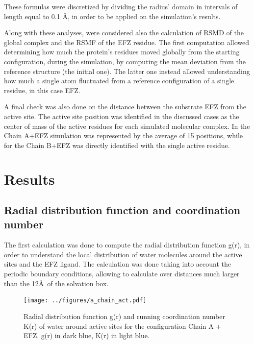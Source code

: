 \documentclass[12pt]{article}
\begin{document}
These formulas were discretized by dividing the radius' domain in intervals of length equal to 0.1 \AA, in order to be applied on the simulation's results.

Along with these analyses, were considered also the calculation of RSMD of the global complex and the RSMF of the EFZ residue. The first computation allowed determining how much the protein's residues moved globally from the starting configuration, during the simulation, by computing the mean deviation from the reference structure (the initial one). The latter one instead allowed understanding how much a single atom fluctuated from a reference configuration of a single residue, in this case EFZ.

A final check was also done on the distance between the substrate EFZ from the active site. The active site position was identified in the discussed cases as the center of mass of the active residues for each simulated molecular complex. In the Chain A+EFZ simulation was represented by the average of 15 positions, while for the Chain B+EFZ was directly identified with the single active residue.
\section{Results}

\subsection{Radial distribution function and coordination number}
The first calculation was done to compute the radial distribution function g(r), in order to understand the local distribution of water molecules around the active sites and the EFZ ligand. The calculation was done taking into account the periodic boundary conditions, allowing to calculate over distances much larger than the 12\AA \, of the solvation box.

\begin{figure}
    \centering
    \texttt{[image: ../figures/a\_chain\_act.pdf]}
    \caption{Radial distribution function g(r) and running coordination number K(r) of water around active sites for the configuration Chain A + EFZ. g(r) in dark blue, K(r) in light blue.\label{fig:gofr_chain_a_efz_1}}
\end{figure}
\end{document}
